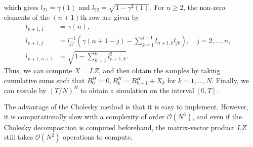 which gives $l_{21}=\gamma(1)$ and $l_{22}=\sqrt{1-\gamma^{2}(1)}$. For $n\geq 2$, the non-zero elements of the $(n+1)$th row are given by
\begin{align*}
    l_{n+1,1}&=\gamma(n),\\
    l_{n+1,j}&=l_{jj}^{-1}\left(\gamma(n+1-j)-\sum_{k=1}^{j-1}l_{n+1,k}l_{jk}\right),\quad j=2,\dots,n,\\
    l_{n+1,n+1}&= \sqrt{1-\sum_{k=1}^{n}l_{n+1,k}^{2}}.
\end{align*}
Thus, we can compute $X=LZ$, and then obtain the samples by taking cumulative sums such that $B_{0}^{H}=0, B_{k}^{H}=B_{k-1}^{H}+X_{k}$ for $k=1,\dots,N$. Finally, we can rescale by $(T/N)^H$ to obtain a simulation on the interval $[0,T]$.

The advantage of the Cholesky method is that it is easy to implement. However, it is computationally slow with a complexity of order $\mathcal{O}(N^{3})$, and even if the Cholesky decomposition is computed beforehand, the matrix-vector product $LZ$ still takes $\mathcal{O}(N^2)$ operations to compute.
